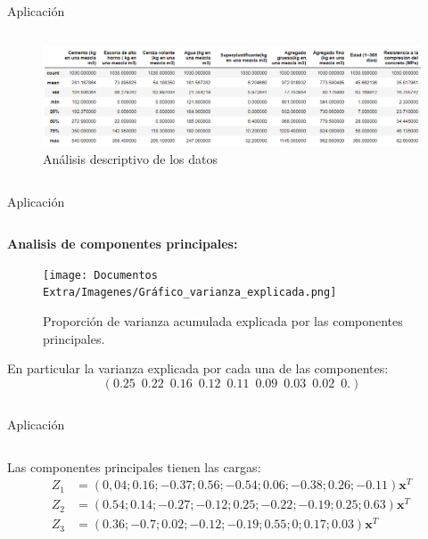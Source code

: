 \begin{frame}{Aplicación}
\begin{columns}
\begin{column}{0.9\textwidth}
\begin{figure}[h]
  \includegraphics[scale=0.3]{Documentos Extra/Imagenes/Resumen_Basicos.png}
  \caption{Análisis descriptivo de los datos}
  \label{fig:resumen_basicos}
\end{figure}
\end{column}
\end{columns}
\end{frame}

\begin{frame}{Aplicación}
\begin{columns}
\begin{column}{0.9\textwidth}
\textbf{Analisis de componentes principales:}
\begin{figure}[h]
  \centering
  \texttt{[image: Documentos Extra/Imagenes/Gráfico\_varianza\_explicada.png]}
  \caption{Proporción de varianza acumulada explicada por las componentes principales.}
  \label{fig:varianza acumulada}
\end{figure}

En particular la varianza explicada por cada una de las componentes:
\begin{equation}
(0.25 \enspace 0.22 \enspace 0.16 \enspace 0.12 \enspace 0.11 \enspace 0.09 \enspace 0.03 \enspace 0.02 \enspace 0.  )
\end{equation}
\end{column}
\end{columns}
\end{frame}

\begin{frame}{Aplicación}
\begin{columns}
\begin{column}{0.9\textwidth}
Las componentes principales tienen las cargas:
\begin{align}
Z_1&=(0,04;0.16;-0.37  ; 0.56  ;   -0.54  ;  0.06 ;  -0.38  ; 0.26  ; -0.11)\mathbf{x}^T\\
Z_2&=(0.54 ; 0.14 ;  -0.27  ; -0.12 ;   0.25  ; -0.22 ;  -0.19 ;  0.25  ;  0.63)\mathbf{x}^T\\
Z_3&=(0.36 ; -0.7 ;  0.02 ;-0.12; -0.19  ; 0.55 ; 0 ;   0.17 ; 0.03)\mathbf{x}^T
\end{align}
\end{column}
\end{columns}
\end{frame}

